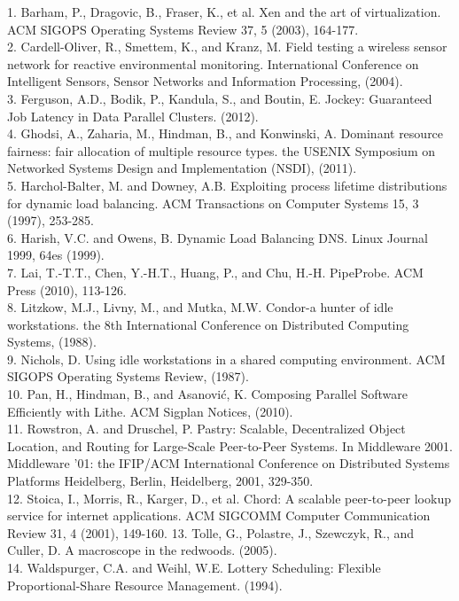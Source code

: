 \documentclass[a4paper]{acm_proc_article-sp}
\begin{document}
1.	Barham, P., Dragovic, B., Fraser, K., et al. Xen and the art of virtualization. ACM SIGOPS Operating Systems Review 37, 5 (2003), 164-177.\\
2.	Cardell-Oliver, R., Smettem, K., and Kranz, M. Field testing a wireless sensor network for reactive environmental monitoring. International Conference on Intelligent Sensors, Sensor Networks and Information Processing, (2004).\\
3.	Ferguson, A.D., Bodik, P., Kandula, S., and Boutin, E. Jockey: Guaranteed Job Latency in Data Parallel Clusters. (2012).\\
4.	Ghodsi, A., Zaharia, M., Hindman, B., and Konwinski, A. Dominant resource fairness: fair allocation of multiple resource types. the USENIX Symposium on Networked Systems Design and Implementation (NSDI), (2011).\\
5.	Harchol-Balter, M. and Downey, A.B. Exploiting process lifetime distributions for dynamic load balancing. ACM Transactions on Computer Systems 15, 3 (1997), 253-285.\\
6.	Harish, V.C. and Owens, B. Dynamic Load Balancing DNS. Linux Journal 1999, 64es (1999).\\
7.	Lai, T.-T.T., Chen, Y.-H.T., Huang, P., and Chu, H.-H. PipeProbe. ACM Press (2010), 113-126.\\
8.	Litzkow, M.J., Livny, M., and Mutka, M.W. Condor-a hunter of idle workstations. the 8th International Conference on Distributed Computing Systems, (1988).\\
9.	Nichols, D. Using idle workstations in a shared computing environment. ACM SIGOPS Operating Systems Review, (1987).\\
10.	Pan, H., Hindman, B., and Asanović, K. Composing Parallel Software Efficiently with Lithe. ACM Sigplan Notices, (2010).\\
11.	Rowstron, A. and Druschel, P. Pastry: Scalable, Decentralized Object Location, and Routing for Large-Scale Peer-to-Peer Systems. In Middleware 2001. Middleware '01: the IFIP/ACM International Conference on Distributed Systems Platforms Heidelberg, Berlin, Heidelberg, 2001, 329-350.\\
12.	Stoica, I., Morris, R., Karger, D., et al. Chord: A scalable peer-to-peer lookup service for internet applications. ACM SIGCOMM Computer Communication Review 31, 4 (2001), 149-160.
13.	Tolle, G., Polastre, J., Szewczyk, R., and Culler, D. A macroscope in the redwoods. (2005).\\
14.	Waldspurger, C.A. and Weihl, W.E. Lottery Scheduling: Flexible Proportional-Share Resource Management. (1994).



\end{document}
